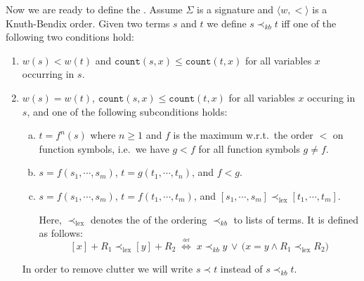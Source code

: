 \begin{Definition}[$\prec_{kb}$]
  Now we are ready to define the .
  Assume $\Sigma$ is a signature and $\langle w, < \rangle$ is a Knuth-Bendix order.
  Given two terms $s$ and $t$ we define $s \prec_{kb} t$ iff one of the following two conditions hold:
\begin{enumerate}
\item $w(s) < w(t)$ and $\texttt{count}(s, x) \leq \texttt{count}(t, x)$
       for all variables $x$ occurring in  $s$.
\item $w(s) = w(t)$, $\texttt{count}(s, x) \leq \texttt{count}(t, x)$ for all variables $x$ occuring in $s$, and
      one of the following subconditions holds:
      \begin{enumerate}[(a)]
      \item $t = f^n(s)$ where $n \geq 1$ and $f$ is the maximum w.r.t.~the order $<$ on function symbols,
             i.e.~we have $g < f$ for all function symbols $g \not= f$.
      \item $s = f(s_1,\cdots,s_m)$, $t=g(t_1,\cdots,t_n)$, and $f<g$.
      \item $s = f(s_1,\cdots,s_m)$, $t=f(t_1,\cdots,t_m)$, and $[s_1,\cdots,s_m] \prec_{\textrm{lex}} [t_1,\cdots,t_m]$.
     
            Here, $\prec_{\textrm{lex}}$ denotes the  of the ordering $\prec_{kb}$ to
            lists of terms.  It is defined as follows:
            $$ [x] + R_1 \prec_{\textrm{lex}} [y] + R_2 \;\stackrel{_\textrm{def}}{\Longleftrightarrow}\;
                 x \prec_{kb} y \,\vee\, \bigl(x = y \wedge R_1 \prec_{\textrm{lex}} R_2\bigr)
            $$
     \end{enumerate}
     In order to remove clutter we will write $s \prec t$ instead of $s \prec_{kb} t$. \eox
\end{enumerate}
\end{Definition}



